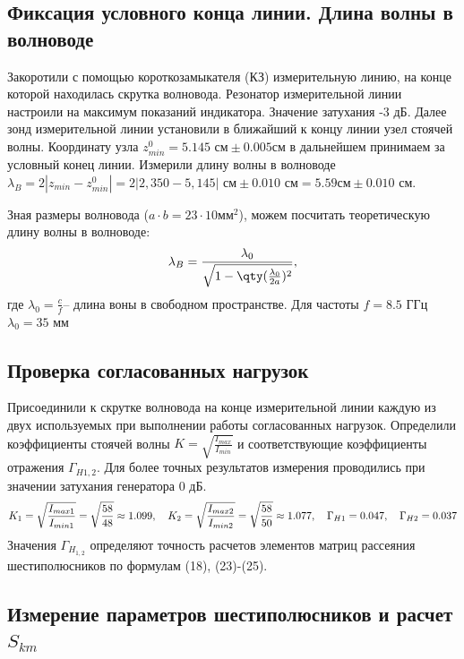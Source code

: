 \subsection{Фиксация условного конца линии. Длина волны в волноводе}

Закоротили с помощью короткозамыкателя (КЗ) измерительную линию, на конце которой  находилась скрутка волновода. Резонатор измерительной линии настроили на максимум показаний индикатора. Значение затухания -3 дБ. Далее зонд измерительной линии установили в ближайший к концу линии узел стоячей волны. Координату узла $z^0_{min}=5.145 \text{ см} \pm 0.005 \text {см}$  в дальнейшем принимаем за условный конец линии. Измерили длину волны в волноводе $\lambda_B=2|z_{min}-z_{min}^0|=2|2,350-5,145| \text{ см}\pm 0.010 \text{ см}=5.59 см\pm 0.010 \text{ см}$.

Зная размеры волновода ($a\cdot b= 23\cdot 10 \text{мм}^2$), можем посчитать теоретическую длину волны в волноводе:
\begin{equation}
	\lambda_{B}=\frac{\lambda_0}{\sqrt{1-\qty(\frac{\lambda_0}{2a})^2}},
\end{equation}
где $\lambda_0=\frac{c}{f}$-- длина воны в свободном пространстве. Для частоты $f=8.5$ ГГц
$\lambda_0=35$ мм
\subsection{Проверка согласованных нагрузок}

Присоединили к скрутке волновода на конце измерительной линии каждую из двух используемых при выполнении работы согласованных нагрузок. Определили коэффициенты стоячей волны $K=\sqrt{\frac{I_{max}}{I_{min}}}$ и соответствующие коэффициенты отражения $\Gamma_{H1,2}$. Для более точных результатов измерения проводились при значении затухания генератора 0 дБ.
\begin{equation}
	\centering
	K_1=\sqrt{\frac{I_{max1}}{I_{min1}}}=\sqrt{\frac{58}{48}}\approx 1.099, ~~~ K_2=\sqrt{\frac{I_{max2}}{I_{min2}}}=\sqrt{\frac{58}{50}}\approx 1.077, ~~~
 	\Gamma_{H1}=0.047, ~~~ \Gamma_{H2}=0.037 
\end{equation}
Значения  $\Gamma_{H_{1,2}}$ определяют точность расчетов элементов матриц рассеяния шестиполюсников по формулам (18), (23)-(25).

\subsection{Измерение параметров шестиполюсников и расчет $S_{km}$}

